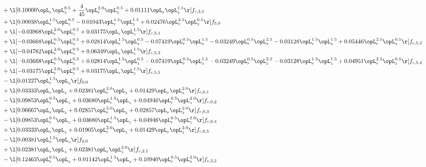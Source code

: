\begin{alignat}{2}
& + \l[  0.10000 \opL_r \opL_z^{0.5} + \frac{4}{45} \opL_r^{2.0} \opL_z^{0.5} +  0.01111 \opL_r \opL_z^{1.5}  \r] f_{c,3,5} \nonumber \\ 
& + \l[  0.00938 \opL_r^{1.5} \opL_z^{0.5}   -0.01043 \opL_r^{1.5} \opL_z^{1.5} +  0.02476 \opL_r^{2.5} \opL_z^{0.5}  \r] f_{5,0} \nonumber \\ 
& + \l[  -0.03968 \opL_r^{2.0} \opL_z^{0.5} +  0.03175 \opL_r \opL_z^{1.5}  \r] f_{c,5,1} \nonumber \\ 
& + \l[  -0.03668 \opL_r^{0.5} \opL_z^{0.5} +  0.02814 \opL_r^{1.5} \opL_z^{0.5}   -0.07419 \opL_r^{0.5} \opL_z^{1.5}   -0.03249 \opL_r^{0.5} \opL_z^{2.5}   -0.03128 \opL_r^{1.5} \opL_z^{1.5} +  0.05446 \opL_r^{2.5} \opL_z^{0.5}  \r] f_{c,5,2} \nonumber \\ 
& + \l[  -0.04762 \opL_r^{2.0} \opL_z^{0.5} +  0.06349 \opL_r \opL_z^{1.5}  \r] f_{c,5,3} \nonumber \\ 
& + \l[  -0.03668 \opL_r^{0.5} \opL_z^{0.5} +  0.02814 \opL_r^{1.5} \opL_z^{0.5}   -0.07419 \opL_r^{0.5} \opL_z^{1.5}   -0.03249 \opL_r^{0.5} \opL_z^{2.5}   -0.03128 \opL_r^{1.5} \opL_z^{1.5} +  0.04951 \opL_r^{2.5} \opL_z^{0.5}  \r] f_{c,5,4} \nonumber \\ 
& + \l[  -0.03175 \opL_r^{2.0} \opL_z^{0.5} +  0.03175 \opL_r \opL_z^{1.5}  \r] f_{c,5,5} \nonumber \\ 
& - \l[  0.01227 \opL_r^{1.5} \opL_z  \r] f_{0,0} \nonumber \\ 
& + \l[  0.03333 \opL_r \opL_z +  0.02381 \opL_r^{2.0} \opL_z +  0.01429 \opL_r \opL_z^{2.0}  \r] f_{c,0,1} \nonumber \\ 
& - \l[  0.09853 \opL_r^{0.5} \opL_z +  0.03680 \opL_r^{1.5} \opL_z +  0.04946 \opL_r^{0.5} \opL_z^{2.0}  \r] f_{c,0,2} \nonumber \\ 
& + \l[  0.06667 \opL_r \opL_z +  0.02857 \opL_r^{2.0} \opL_z +  0.02857 \opL_r \opL_z^{2.0}  \r] f_{c,0,3} \nonumber \\ 
& - \l[  0.09853 \opL_r^{0.5} \opL_z +  0.03680 \opL_r^{1.5} \opL_z +  0.04946 \opL_r^{0.5} \opL_z^{2.0}  \r] f_{c,0,4} \nonumber \\ 
& + \l[  0.03333 \opL_r \opL_z +  0.01905 \opL_r^{2.0} \opL_z +  0.01429 \opL_r \opL_z^{2.0}  \r] f_{c,0,5} \nonumber \\ 
& - \l[  0.00381 \opL_r^{1.5} \opL_z  \r] f_{2,0} \nonumber \\ 
& + \l[  0.02381 \opL_r \opL_z +  0.02381 \opL_r \opL_z^{2.0}  \r] f_{c,2,1} \nonumber \\ 
& - \l[  0.12463 \opL_r^{0.5} \opL_z +  0.01142 \opL_r^{1.5} \opL_z +  0.10940 \opL_r^{0.5} \opL_z^{2.0}  \r] f_{c,2,2} \nonumber \\ 

\end{alignat}
